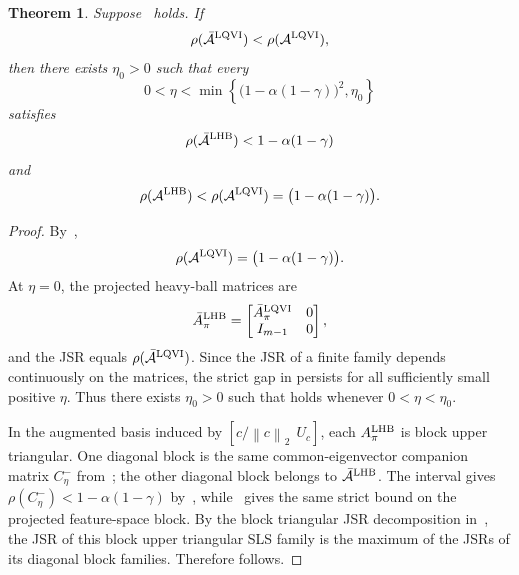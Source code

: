 \documentclass[letterpaper]{article}
\numberwithin{equation}{section}
\newtheorem{theorem}{Theorem}[section]
\begin{document}
\begin{theorem}
\label{thm:linear-fa-jsr-improvement}
Suppose~ holds. If
\begin{equation}
  \rho(\bar{\mathcal A}^{\rm LQVI})<\rho(\mathcal A^{\rm LQVI}),
  \label{eq:linear-fa-projected-gap}
\end{equation}
then there exists $\eta_0>0$ such that every
\begin{equation}
  0<\eta<\min\left\{\bigl(1-\alpha(1-\gamma)\bigr)^2,\eta_0\right\}
  \label{eq:linear-fa-eta-condition}
\end{equation}
satisfies
\begin{equation}
  \rho(\bar{\mathcal A}^{\rm LHB})<1-\alpha(1-\gamma)
  \label{eq:linear-fa-projected-jsr-less}
\end{equation}
and
\begin{equation}
  \rho(\mathcal A^{\rm LHB})
  <\rho(\mathcal A^{\rm LQVI})=\bigl(1-\alpha(1-\gamma)\bigr).
  \label{eq:linear-fa-jsr-less}
\end{equation}
\end{theorem}
\begin{proof}
By~,
\begin{align*}
  \rho(\mathcal A^{\rm LQVI})=\bigl(1-\alpha(1-\gamma)\bigr).
\end{align*}
At $\eta=0$, the projected heavy-ball matrices are
\begin{align*}
  \bar A_\pi^{\rm LHB}=
  \begin{bmatrix}
    \bar A_\pi^{\rm LQVI}&0\\
    I_{m-1}&0
  \end{bmatrix},
\end{align*}
and the JSR equals $\rho(\bar{\mathcal A}^{\rm LQVI})$. Since the JSR of a finite
family depends continuously on the matrices, the strict gap in
 persists for all sufficiently small positive
$\eta$. Thus there exists $\eta_0>0$ such that
 holds whenever $0<\eta<\eta_0$.

In the augmented basis induced by $[c/\left\lVert c \right\rVert_2\ \ U_c]$, each
$A_\pi^{\rm LHB}$ is block upper triangular. One diagonal block is the same
common-eigenvector companion matrix $C_\eta^-$ from~; the other
diagonal block belongs to $\bar{\mathcal A}^{\rm LHB}$. The interval
 gives
$\rho(C_\eta^-)<1-\alpha(1-\gamma)$ by~,
while~ gives the same strict bound on the
projected feature-space block. By the block triangular JSR decomposition in~,
the JSR of this block upper triangular SLS family is the maximum of the
JSRs of its diagonal block families. Therefore 
follows.
\end{proof}
\end{document}
